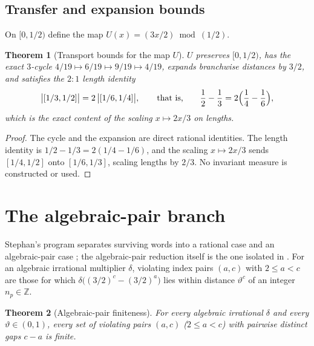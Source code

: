 \documentclass[11pt,a4paper]{article}
\newtheorem{theorem}{Theorem}[section]
\theoremstyle{remark}
\newcommand{\Z}{\mathbb{Z}}
\begin{document}
\subsection{Transfer and expansion bounds}

On $[0,1/2)$ define the map $U(x) = (3x/2) \bmod (1/2)$.

\begin{theorem}[Transport bounds for the map $U$]
\label{thm:cup}
$U$ preserves $[0,1/2)$, has the exact $3$-cycle $4/19 \mapsto 6/19 \mapsto 9/19 \mapsto 4/19$, expands branchwise distances by $3/2$, and satisfies the $2{:}1$ length identity
\[
  \bigl|[1/3,1/2]\bigr| = 2\,\bigl|[1/6,1/4]\bigr|,
  \qquad\text{that is,}\qquad \frac12 - \frac13 = 2\Bigl(\frac14 - \frac16\Bigr),
\]
which is the exact content of the scaling $x \mapsto 2x/3$ on lengths.
\end{theorem}

\begin{proof}
The cycle and the expansion are direct rational identities. The length identity is $1/2 - 1/3 = 2(1/4 - 1/6)$, and the scaling $x \mapsto 2x/3$ sends $[1/4,1/2]$ onto $[1/6,1/3]$, scaling lengths by $2/3$. No invariant measure is constructed or used.
\end{proof}

\section{The algebraic-pair branch}
\label{sec:algpair}

Stephan's program separates surviving words into a rational case and an algebraic-pair case \citep{stephan2026subspace,stephan2026minimal,stephan2026third}; the algebraic-pair reduction itself is the one isolated in \citep{stephan2026minimal}. For an algebraic irrational multiplier $\delta$, violating index pairs $(a,c)$ with $2 \le a < c$ are those for which $\delta\bigl((3/2)^{c} - (3/2)^{a}\bigr)$ lies within distance $\vartheta^{c}$ of an integer $n_{p} \in \Z$.

\begin{theorem}[Algebraic-pair finiteness]
\label{thm:algpair}
For every algebraic irrational $\delta$ and every $\vartheta \in (0,1)$, every set of violating pairs $(a,c)$ ($2 \le a < c$) with pairwise distinct gaps $c-a$ is finite.
\end{theorem}
\end{document}
